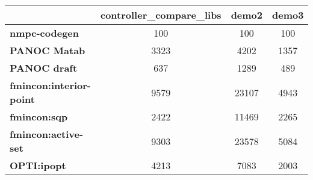\begin{tiny}\begin{tabular}{|l|c|c|c|}
\hline
&\textbf{controller_compare_libs}&\textbf{demo2}&\textbf{demo3}\\\hline
\textbf{nmpc-codegen}&100&100&100\\\hline
\textbf{PANOC Matab}&3323&4202&1357\\\hline
\textbf{PANOC draft}&637&1289&489\\\hline
\textbf{fmincon:interior-point}&9579&23107&4943\\\hline
\textbf{fmincon:sqp}&2422&11469&2265\\\hline
\textbf{fmincon:active-set}&9303&23578&5084\\\hline
\textbf{OPTI:ipopt}&4213&7083&2003\\\hline
\end{tabular}
\end{tiny}